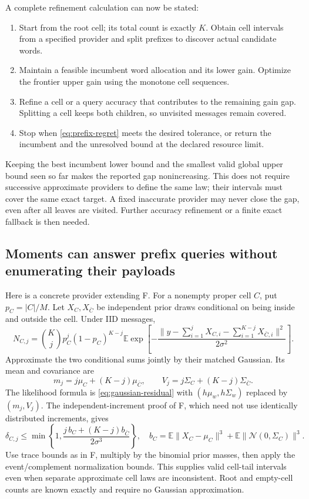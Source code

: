 \documentclass[10pt,a4paper]{article}
\newcommand{\E}{\mathbb E}
\begin{document}
A complete refinement calculation can now be stated:
\begin{enumerate}
\item Start from the root cell; its total count is exactly $K$. Obtain cell intervals from a specified
      provider and split prefixes to discover actual candidate words.
\item Maintain a feasible incumbent word allocation and its lower gain. Optimize the frontier upper gain
      using the monotone cell sequences.
\item Refine a cell or a query accuracy that contributes to the remaining gain gap. Splitting a cell keeps
      both children, so unvisited messages remain covered.
\item Stop when \eqref{eq:prefix-regret} meets the desired tolerance, or return the incumbent and the
      unresolved bound at the declared resource limit.
\end{enumerate}
Keeping the best incumbent lower bound and the smallest valid global upper bound seen so far makes the
reported gap nonincreasing. This does not require successive approximate providers to define the same law;
their intervals must cover the same exact target. A fixed inaccurate provider may never close the gap,
even after all leaves are visited. Further accuracy refinement or a finite exact fallback is then needed.

\subsection{Moments can answer prefix queries without enumerating their payloads}
Here is a concrete provider extending F. For a nonempty proper cell $C$, put $p_C=|C|/M$.
Let $X_C,X_{\bar C}$ be independent prior draws conditional on being inside and outside the cell.
Under IID messages,
\[
 N_{C,j}=\binom Kj p_C^j(1-p_C)^{K-j}
 \E\exp\!\left[-\frac{\|y-\sum_{i=1}^jX_{C,i}
                          -\sum_{i=1}^{K-j}X_{\bar C,i}\|^2}{2\sigma^2}\right].
\]
Approximate the two conditional sums jointly by their matched Gaussian. Its mean and covariance are
\[
 m_j=j\mu_C+(K-j)\mu_{\bar C},\qquad
 V_j=j\Sigma_C+(K-j)\Sigma_{\bar C}.
\]
The likelihood formula is \eqref{eq:gaussian-residual} with $(h\mu_w,h\Sigma_w)$ replaced by $(m_j,V_j)$.
The independent-increment proof of F, which need not use identically distributed increments, gives
\[
 \delta_{C,j}\leq
 \min\!\left\{1,\frac{j\,b_C+(K-j)b_{\bar C}}{2\sigma^3}\right\},\quad
 b_C=\E\|X_C-\mu_C\|^3+
     \E\|\mathcal N(0,\Sigma_C)\|^3.
\]
Use trace bounds as in F, multiply by the binomial prior masses, then apply the event/complement
normalization bounds. This supplies valid cell-tail intervals even when separate approximate cell laws are
inconsistent. Root and empty-cell counts are known exactly and require no Gaussian approximation.
\end{document}
